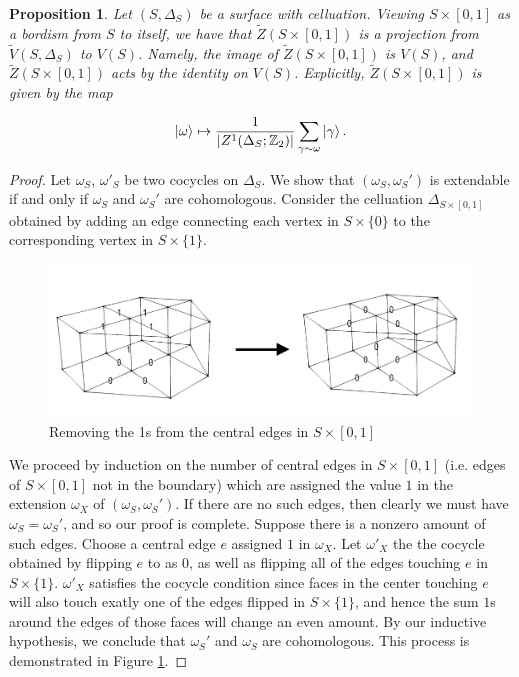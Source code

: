 \documentclass{article}
\newtheorem{proposition}{Proposition}[section]
\theoremstyle{definition}
\numberwithin{figure}{section}
\begin{document}
\begin{proposition}\label{Z formula} Let $(S,\Delta_S)$ be a surface with celluation. Viewing $S\times [0,1]$ as a bordism from $S$ to itself, we have that $\tilde{Z}(S\times [0,1])$ is a projection from $\tilde{V}(S,\Delta_S)$ to $V(S)$. Namely, the image of $\tilde{Z}(S\times [0,1])$ is $V(S)$, and $\tilde{Z}(S\times [0,1])$ acts by the identity on $V(S)$. Explicitly, $\tilde{Z}(S\times [0,1])$ is given by the map

$$\left| \omega\right>\mapsto \frac{1}{|Z^1(\Delta_{S};\mathbb{Z}_2)|}\sum_{\gamma \sim \omega}\left|\gamma\right>.$$

\end{proposition}
\begin{proof} Let $\omega_{S}$, $\omega'_{S}$ be two cocycles on $\Delta_{S}$. We show that $(\omega_{S},\omega_{S}')$ is extendable if and only if $\omega_{S}$ and $\omega_{S}'$ are cohomologous. Consider the celluation $\Delta_{S\times [0,1]}$ obtained by adding an edge connecting each vertex in $S\times\{0\}$ to the corresponding vertex in $S\times \{1\}$.

\begin{figure}
\begin{center}
\includegraphics[scale=0.3]{cohomologous}
\caption{Removing the 1s from the central edges in $S\times [0,1]$}
\label{fig:cohomologous}
\end{center}
\end{figure}

We proceed by induction on the number of central edges in $S\times [0,1]$ (i.e. edges of $S\times [0,1]$ not in the boundary) which are assigned the value $1$ in the extension $\omega_X$ of $(\omega_{S},\omega_{S}')$. If there are no such edges, then clearly we must have $\omega_{S}=\omega_{S}'$, and so our proof is complete. Suppose there is a nonzero amount of such edges. Choose a central edge $e$ assigned $1$ in $\omega_X$. Let $\omega'_X$ the the cocycle obtained by flipping $e$ to as $0$, as well as flipping all of the edges touching $e$ in $S\times\{1\}$. $\omega'_X$ satisfies the cocycle condition since faces in the center touching $e$ will also touch exatly one of the edges flipped in $S\times \{1\}$, and hence the sum $1$s around the edges of those faces will change an even amount. By our inductive hypothesis, we conclude that $\omega_{S}'$ and $\omega_{S}$ are cohomologous. This process is demonstrated in Figure \ref{fig:cohomologous}.


\end{proof}
\end{document}
